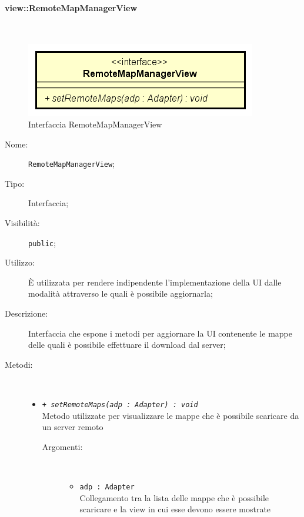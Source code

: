 \documentclass[../DefinizioneDiProdotto.tex]{subfiles}
\begin{document}
\paragraph{view::RemoteMapManagerView}
\
\begin{figure}[H]
	\centering
	\includegraphics[width=\maxwidth]{img/RemoteMapManagerView.png}
	\caption{Interfaccia RemoteMapManagerView}\label{fig:view::RemoteMapManagerView} 
\end{figure}
\begin{description}
	\item[Nome:] \texttt{RemoteMapManagerView};
	\item[Tipo:] Interfaccia;
	\item[Visibilità:] \texttt{public};
	\item[Utilizzo:] È utilizzata per rendere indipendente l'implementazione della UI dalle modalità attraverso le quali è possibile aggiornarla;
	\item[Descrizione:] Interfaccia che espone i metodi per aggiornare la UI contenente le mappe delle quali è possibile effettuare il download dal server;
	\item[Metodi:] \
	\begin{itemize}
		\item \texttt{+ \textit{setRemoteMaps(adp : Adapter) : void}}\\
		Metodo utilizzate per visualizzare le mappe che è possibile scaricare da un server remoto
		\begin{description}
			\item[Argomenti:] \
			\begin{itemize}
				\item \texttt{adp : Adapter}\\
				Collegamento tra la lista delle mappe che è possibile scaricare e la view in cui esse devono essere mostrate\end{itemize}
		\end{description}
	\end{itemize}
\end{description}
\end{document}
